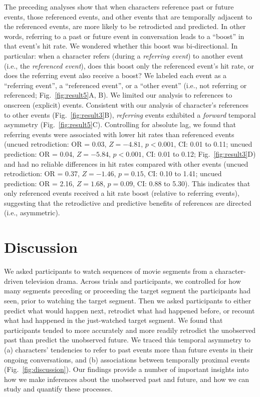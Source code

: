 \documentclass[10pt]{article}
\begin{document}
The preceding analyses show that when characters reference past or future events, those referenced events, and other events that are temporally adjacent to the referenced events, are more likely to be retrodicted and predicted.  In other words, referring to a past or future event in conversation leads to a ``boost'' in that event's hit rate.  We wondered whether this boost was bi-directional.  In particular: when a character refers (during a \textit{referring event}) to another event (i.e., the \textit{referenced event}), does this boost only the referenced event's hit rate, or does the referring event also receive a boost?  We labeled each event as a ``referring event'', a ``referenced event'', or a ``other event'' (i.e., not referring or referenced; Fig.~\ref{fig:result5}A, B).  We limited our analysis to references to onscreen (explicit) events.   Consistent with our analysis of character's references to other events (Fig.~\ref{fig:result3}B), \textit{referring} events exhibited a \textit{forward} temporal asymmetry (Fig.~\ref{fig:result5}C).  Controlling for absolute lag, we found that referring events were associated with lower hit rates than referenced events (uncued retrodiction: OR = 0.03, $Z = -4.81$, $p < 0.001$, CI: 0.01 to 0.11; uncued prediction: OR = 0.04, $Z = -5.84$, $p < 0.001$, CI: 0.01 to 0.12; Fig.~\ref{fig:result3}D) and had no reliable differences in hit rates compared with other events (uncued retrodiction: OR = 0.37, $Z = -1.46$, $p = 0.15$, CI: 0.10 to 1.41; uncued prediction: OR = 2.16, $Z = 1.68$, $p = 0.09$, CI: 0.88 to 5.30).  This indicates that only referenced events received a hit rate boost (relative to referring events), suggesting that the retrodictive and predictive benefits of references are directed (i.e., asymmetric).


\section*{Discussion}
We asked participants to watch sequences of movie segments from a character-driven television drama.  Across trials and participants, we controlled for how many segments preceding or proceeding the target segment the participants had seen, prior to watching the target segment.  Then we asked participants to either predict what would happen next, retrodict what had happened before, or recount what had happened in the just-watched target segment.  We found that participants tended to more accurately and more readily retrodict the unobserved past than predict the unobserved future.  We traced this temporal asymmetry to (a) characters’ tendencies to refer to past events more than future events in their ongoing conversations, and (b) associations between temporally proximal events (Fig.~\ref{fig:discussion}).  Our findings provide a number of important insights into how we make inferences about the unobserved past and future, and how we can study and quantify these processes.
\end{document}
